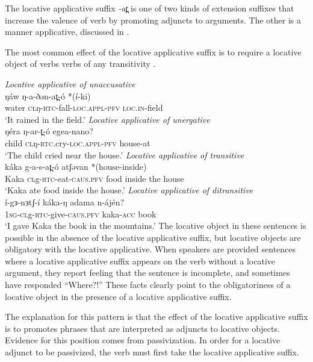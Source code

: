 The locative applicative suffix \textit{-at̪} is one of two kinds of extension suffixes that increase the valence of verb by promoting adjuncts to arguments. The other is a manner applicative, discussed in . 

The most common effect of the locative applicative suffix is to require a locative object of verbs verbs of any transitivity \citep{sec:ch12:locobj}.

\ea \textit{Locative applicative of unaccusative}\\
	\gll   ŋáw ŋ-a-ðən-at̪-ó *(í-ki)\\
		water \textsc{cl}ŋ-\textsc{rtc}-fall-\textsc{loc.appl-pfv} \textsc{loc.in}-field\\
	\glt 	 `It rained in the field.'
\ex  \textit{Locative applicative of unergative}\\
 	\gll  ŋéra  ŋ-ar-t̪-ó  egea-nano?\\
 		child \textsc{cl}ŋ-\textsc{rtc}.cry-\textsc{loc.appl-pfv} house-at\\
	\glt  `The child cried near the house.'
\ex  \textit{Locative applicative of transitive}\\
 	\gll káka g-a-s-at̪-ó atʃəvan *(house-inside)			 \\
 	Kaka \textsc{cl}g-\textsc{rtc}-eat-\textsc{caus.pfv} food inside the house \\
 	\glt  `Kaka ate food inside the house.'
\ex  \textit{Locative applicative of ditransitive}\\
 	\gll í-gɜ-nɜtʃ-í káka-ŋ adama n-ájén?		 \\
 	\textsc{1sg-cl}g-\textsc{rtc}-give-\textsc{caus.pfv}  kaka-\textsc{acc} book \\
 	\glt  `I gave Kaka the book in the mountains.'
 \z 
The locative object in these sentences is possible in the absence of the locative applicative suffix, but locative objects are obligatory with the locative applicative. When speakers are provided sentences where a locative applicative suffix appears on the verb without a locative argument, they report feeling that the sentence is incomplete, and sometimes have responded ``Where?!'' These facts clearly point to the obligatoriness of a locative object in the presence of a locative applicative suffix.

The explanation for this pattern is that the effect of the locative applicative suffix is to promotes phrases that are interpreted as adjuncts to locative objects. Evidence for this position comes from passivization. In order for a locative adjunct to be passivized, the verb must first take the locative applicative suffix.

